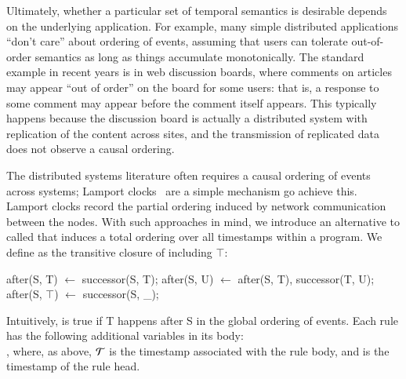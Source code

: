 Ultimately, whether a particular set of temporal semantics is
desirable depends on the underlying application.  For example, many simple distributed applications ``don't care'' about ordering of events, assuming that users can tolerate out-of-order semantics as long as things accumulate monotonically.  The standard example in recent years is in web discussion boards, where comments on articles may appear ``out of order'' on the board for some users: that is, a response to some comment may appear before the comment itself appears.  This typically happens because the discussion board is actually a distributed system with replication of the content across sites, and the transmission of replicated data does not observe a causal ordering.


The distributed systems literature often requires a causal ordering
of events across systems; Lamport clocks~\cite{lamportclock} are a simple mechanism go achieve this.  Lamport clocks
record the partial ordering induced by network communication between
the nodes.  With such approaches in mind, we introduce an alternative
to  called  that induces a total
ordering over all timestamps within a \lang program.  We define  as the transitive closure of  including $\top$:

\begin{Dedalus}
after(S, T) \(\leftarrow\) successor(S, T);
after(S, U) \(\leftarrow\) after(S, T), successor(T, U);
after(S, \(\top\)) \(\leftarrow\) successor(S, _);
\end{Dedalus}

Intuitively,  is true if T happens after S in the
global ordering of events.  Each rule  has the
following additional variables in its body:
 \\
, where, as
above, $\Tau$ is the timestamp associated with the rule body, and
 is the timestamp of the rule head.

